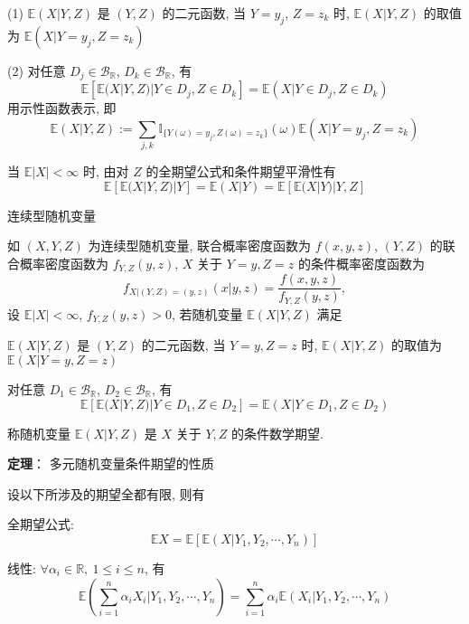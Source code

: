 \documentclass[openany]{ctexbook}
\theoremstyle{kaiti}
\theoremstyle{normal}
\begin{document}
(1) $\mathbb{E}(X|Y,Z)$ 是 $(Y,Z)$ 的二元函数, 当 $Y=y_j$, $Z=z_k$ 时, $\mathbb{E}(X|Y,Z)$ 的取值为 $\mathbb{E}(X|Y=y_j,Z=z_k)$

(2) 对任意 $D_j\in\mathcal{B}_{\mathbb{R}}$, $D_k\in\mathcal{B}_{\mathbb{R}}$, 有
\begin{equation}
  \mathbb{E}[\mathbb{E}(X|Y,Z)|Y\in D_j,Z\in D_k]=\mathbb{E}(X|Y\in D_j,Z\in D_k)
\end{equation}
用示性函数表示, 即
\begin{equation}
  \mathbb{E}(X|Y,Z):=\sum_{j,k}\mathbb{I}_{\{Y(\omega)=y_j,Z(\omega)=z_k\}}(\omega)\mathbb{E}(X|Y=y_j,Z=z_k)
\end{equation}

当 $\mathbb{E}|X|<\infty$ 时, 由对 $Z$ 的全期望公式和条件期望平滑性有 
\begin{equation}
  \mathbb{E}[\mathbb{E}(X|Y,Z)|Y]=\mathbb{E}(X|Y)=\mathbb{E}[\mathbb{E}(X|Y)|Y,Z]
\end{equation}

连续型随机变量

如 $(X,Y,Z)$ 为连续型随机变量, 联合概率密度函数为 $f(x,y,z)$, $(Y,Z)$ 的联合概率密度函数为 $f_{Y,Z}(y,z)$, $X$ 关于 $Y=y,Z=z$ 的条件概率密度函数为
\begin{equation}
  f_{X|(Y,Z)=(y,z)}(x|y,z)=\frac{f(x,y,z)}{f_{Y,Z}(y,z)},
\end{equation} 设 $\mathbb{E}|X|<\infty$, $f_{Y,Z}(y,z)>0$, 若随机变量 $\mathbb{E}(X|Y,Z)$ 满足

 $\mathbb{E}(X|Y,Z)$ 是 $(Y,Z)$ 的二元函数, 当 $Y=y,Z=z$ 时, $\mathbb{E}(X|Y,Z)$ 的取值为 $\mathbb{E}(X|Y=y,Z=z)$

对任意 $D_1\in\mathcal{B}_{\mathbb{R}}$, $D_2\in\mathcal{B}_{\mathbb{R}}$, 有
\begin{equation}
  \mathbb{E}[\mathbb{E}(X|Y,Z)|Y\in D_1,Z\in D_2]=\mathbb{E}(X|Y\in D_1,Z\in D_2)
\end{equation}

称随机变量 $\mathbb{E}(X|Y,Z)$ 是 $X$ 关于 $Y,Z$ 的条件数学期望.

\textbf{定理}： 多元随机变量条件期望的性质

设以下所涉及的期望全都有限, 则有

全期望公式:
\begin{equation}
  \mathbb{E}X=\mathbb{E}[\mathbb{E}(X|Y_1,Y_2,\cdots,Y_n)]
\end{equation}

线性: $\forall \alpha_i\in\mathbb{R},~1\leqslant i\leqslant n$, 有
\begin{equation}
  \mathbb{E}\left(\sum_{i=1}^n\alpha_iX_i\Big|Y_1,Y_2,\cdots,Y_n\right)=\sum_{i=1}^n\alpha_i\mathbb{E}(X_i|Y_1,Y_2,\cdots,Y_n)
\end{equation}
\end{document}
